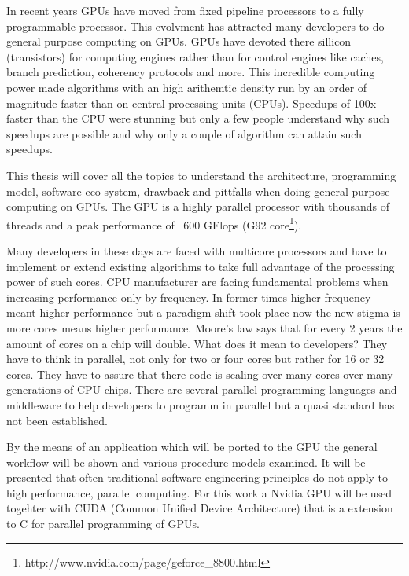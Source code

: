 
In recent years \glspl{GPU} have moved from fixed pipeline  processors to a 
fully programmable processor. This evolvment
has attracted many developers to do general purpose computing on GPUs.
\glspl{GPU} have devoted there sillicon (transistors) for computing engines
rather than for control engines like caches, branch prediction, coherency
protocols and more. This incredible computing power made algorithms with an high
arithemtic density run by an order of magnitude faster than on central
processing units (CPUs). Speedups of 100x faster than the CPU were stunning but
only a few people understand why such speedups are possible and why only a
couple of algorithm can attain such speedups.

This thesis will cover all the topics to understand the architecture,
programming model, software eco system, drawback and pittfalls when doing
general purpose computing on GPUs. The \gls{GPU} is a highly parallel processor with
thousands of threads and a peak performance of ~600 GFlops (G92
core\footnote{http://www.nvidia.com/page/geforce\_8800.html}).

Many developers in these days are faced with multicore processors and have to
implement or extend existing algorithms to take full advantage of the
processing power of such cores. CPU manufacturer are facing fundamental problems
when increasing performance only by frequency. In former times higher frequency
meant higher performance but a paradigm shift took place now the new stigma is
more cores means higher performance. Moore's law says that for every 2 years the
amount of cores on a chip will double. What does it mean to developers? They
have to think in parallel, not only for two or four cores but rather for 16 or
32 cores. They have to assure that there code is scaling over many cores over
many generations of CPU chips. There are several parallel programming languages
and middleware to help developers to programm in parallel but a quasi standard
has not been established.

By the means of an application which will be ported to the \gls{GPU} the general
workflow will be shown and various procedure models examined. It will be
presented that often traditional software engineering principles do not
apply to high performance, parallel computing. For this work a Nvidia \gls{GPU} will
be used togehter with CUDA (Common Unified Device Architecture) that is a
extension to C for parallel programming of GPUs. 

